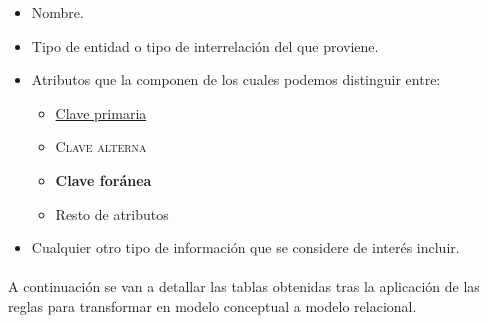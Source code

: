    \begin{itemize}
    \item Nombre.
    \item Tipo de entidad o tipo de interrelación del que proviene.
    \item Atributos que la componen de los cuales podemos distinguir entre:
    \begin{itemize}
     \item \underline{Clave primaria}
     \item \textsc{Clave alterna}
     \item \textbf{Clave foránea}
     \item Resto de atributos
    \end{itemize}
    \item Cualquier otro tipo de información que se considere de interés
          incluir.
   \end{itemize}

  \paragraph{}A continuación se van a detallar las tablas obtenidas tras la
  aplicación de las reglas para transformar en modelo conceptual a modelo
  relacional.
